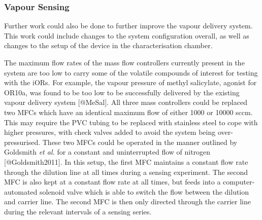 \documentclass[
  letterpaper,
  DIV=11,
  numbers=noendperiod]{scrartcl}
\begin{document}
\hypertarget{sec-future-work-vapour}{%
\subsubsection{Vapour Sensing}\label{sec-future-work-vapour}}

Further work could also be done to further improve the vapour delivery
system. This work could include changes to the system configuration
overall, as well as changes to the setup of the device in the
characterisation chamber.

The maximum flow rates of the mass flow controllers currently present in
the system are too low to carry some of the volatile compounds of
interest for testing with the iORs. For example, the vapour pressure of
methyl salicylate, agonist for OR10a, was found to be too low to be
successfully delivered by the existing vapour delivery system
{[}@MeSal{]}. All three mass controllers could be replaced two MFCs
which have an identical maximum flow of either 1000 or 10000 sccm. This
may require the PVC tubing to be replaced with stainless steel to cope
with higher pressures, with check valves added to avoid the system being
over-pressurised. These two MFCs could be operated in the manner
outlined by Goldsmith \emph{et al.} for a constant and uninterrupted
flow of nitrogen {[}@Goldsmith2011{]}. In this setup, the first MFC
maintains a constant flow rate through the dilution line at all times
during a sensing experiment. The second MFC is also kept at a constant
flow rate at all times, but feeds into a computer-automated solenoid
valve which is able to switch the flow between the dilution and carrier
line. The second MFC is then only directed through the carrier line
during the relevant intervals of a sensing series.
\end{document}
